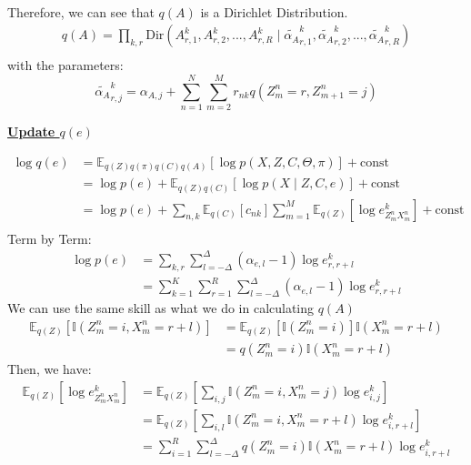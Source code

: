 \documentclass[12pt]{article}
\newenvironment{problem}[2][Problem]{\begin{trivlist}
\item[\hskip \labelsep {\bfseries #1}\hskip \labelsep {\bfseries #2.}]}{\end{trivlist}}
\begin{document}
\begin{problem}{2.8.24}
\begin{align*}
\end{align*}
Therefore, we can see that $q(A)$ is a Dirichlet Distribution.
\begin{align*}
    q(A) = \prod_{k,r} \mathrm{Dir}(A^k_{r,1}, A^k_{r,2}, ..., A^k_{r,R}
        \mid \tilde{\alpha_{A}}^k_{r,1},\tilde{\alpha_{A}}^k_{r,2},...,\tilde{\alpha_{A}}^k_{r,R}) \\
\end{align*}
with the parameters:
\begin{equation}
    \tilde{\alpha_{A}}^k_{r,j} = \alpha_{A,j} + \sum_{n=1}^{N}\sum_{m=2}^{M}r_{nk} q(Z^n_{m}=r, Z^n_{m+1}=j)
\end{equation}

\begin{flushleft}
    \textbf{\underline{Update $q(e)$}}
\end{flushleft}
\begin{align*}
    \log q(e) &= \mathbb{E}_{q(Z)q(\pi)q(C)q(A)}[\log p(X, Z, C, \Theta, \pi)] + \text{const} \\
    &= \log p(e) + \mathbb{E}_{q(Z)q(C)}[\log p(X\mid Z, C, e)] + \text{const} \\
    &= \log p(e) 
        + \sum_{n,k}\mathbb{E}_{q(C)}[c_{nk}]\sum_{m=1}^{M}\mathbb{E}_{q(Z)}[\log e^k_{Z^n_{m}X^n_{m}}] 
        + \text{const} \\
\end{align*}
Term by Term:
\begin{align*}
    \log p(e) &= \sum_{k,r}\sum_{l=-\Delta}^{\Delta} (\alpha_{e,l} - 1)\log e^k_{r,r+l} \\
    &= \sum_{k=1}^{K}\sum_{r=1}^{R}\sum_{l=-\Delta}^{\Delta} (\alpha_{e,l} - 1)\log e^k_{r,r+l}
\end{align*}
We can use the same skill as what we do in calculating $q(A)$
\begin{align*}
    \mathbb{E}_{q(Z)}[\mathbb{I}(Z^n_{m}=i, X^n_{m}=r+l)] 
    &= \mathbb{E}_{q(Z)}[\mathbb{I}(Z^n_{m}=i)]\mathbb{I}(X^n_{m}=r+l) \\
    &= q(Z^n_{m}=i)\mathbb{I}(X^n_{m}=r+l)
\end{align*}
Then, we have:
\begin{align*}
    \mathbb{E}_{q(Z)}[\log e^k_{Z^n_{m}X^n_{m}}] 
    &= \mathbb{E}_{q(Z)}[\sum_{i,j}\mathbb{I}(Z^n_{m}=i, X^n_{m}=j)\log e^k_{i,j}] \\
    &= \mathbb{E}_{q(Z)}[\sum_{i,l}\mathbb{I}(Z^n_{m}=i, X^n_{m}=r+l)\log e^k_{i,r+l}] \\
    &= \sum_{i=1}^{R}\sum_{l=-\Delta}^{\Delta}q(Z^n_{m}=i)\mathbb{I}(X^n_{m}=r+l)\log e^k_{i,r+l} \\

\end{align*}
\end{problem}
\end{document}
